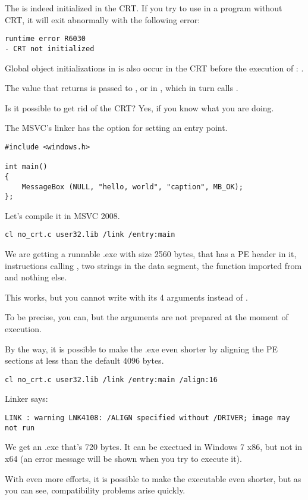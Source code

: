The  is indeed initialized in the \ac{CRT}.
If you try to use  in a program without CRT, it will exit abnormally with the following error:

\begin{lstlisting}
runtime error R6030
- CRT not initialized
\end{lstlisting}

Global object initializations in \Cpp is also occur in the \ac{CRT} before the execution of \main{}: 
.

The value that \main{} returns is passed to , 
or in , which in turn calls .

Is it possible to get rid of the \ac{CRT}?
Yes, if you know what you are doing.

The \ac{MSVC}'s linker has the  option for setting an entry point.

\begin{lstlisting}
#include <windows.h>

int main()
{
	MessageBox (NULL, "hello, world", "caption", MB_OK);
};
\end{lstlisting}

Let's compile it in MSVC 2008.

\begin{lstlisting}
cl no_crt.c user32.lib /link /entry:main
\end{lstlisting}

We are getting a runnable .exe with size 2560 bytes, that has a PE header in it, instructions calling
, two strings in the data segment,
the  function imported from  and nothing else.

This works, but you cannot write  with its 4 arguments instead of \main{}.

To be precise, you can, but the arguments are not prepared at the moment of execution.

By the way, it is possible to make the .exe even 
shorter by aligning the \ac{PE} sections at less than the default 4096 bytes.

\begin{lstlisting}
cl no_crt.c user32.lib /link /entry:main /align:16
\end{lstlisting}

Linker says:

\begin{lstlisting}
LINK : warning LNK4108: /ALIGN specified without /DRIVER; image may not run
\end{lstlisting}

We get an .exe that's 720 bytes.
It can be exectued in Windows 7 x86, but not in x64 
(an error message will be shown when you try to execute it).

With even more efforts, it is possible
to make the executable even shorter, but as you can see, compatibility problems arise quickly.

